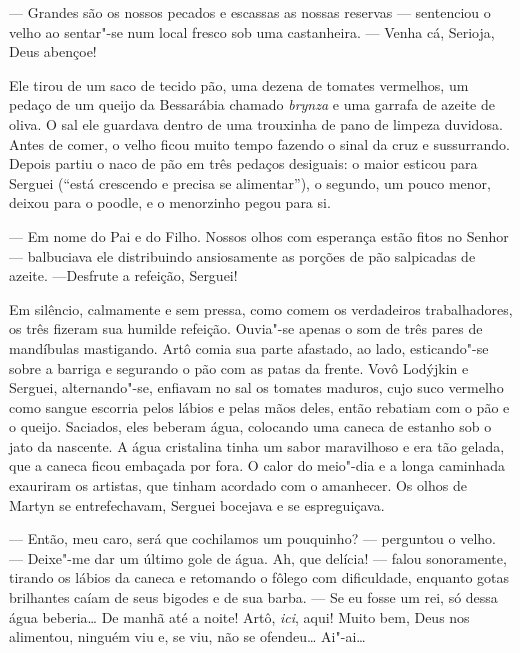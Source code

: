--- Grandes são os nossos pecados e escassas as nossas reservas ---
sentenciou o velho ao sentar"-se num local fresco sob uma castanheira.
--- Venha cá, Serioja, Deus abençoe!

Ele tirou de um saco de tecido pão, uma dezena de tomates vermelhos, um
pedaço de um queijo da Bessarábia chamado \emph{brynza} e uma garrafa de
azeite de oliva. O sal ele guardava dentro de uma trouxinha de pano de
limpeza duvidosa. Antes de comer, o velho ficou muito tempo fazendo o
sinal da cruz e sussurrando. Depois partiu o naco de pão em três pedaços
desiguais: o maior esticou para Serguei (``está crescendo e precisa se
alimentar''), o segundo, um pouco menor, deixou para o poodle, e o
menorzinho pegou para si.

--- Em nome do Pai e do Filho. Nossos olhos com esperança estão fitos no
Senhor --- balbuciava ele distribuindo ansiosamente as porções de pão
salpicadas de azeite. ---Desfrute a refeição, Serguei!

Em silêncio, calmamente e sem pressa, como comem os verdadeiros
trabalhadores, os três fizeram sua humilde refeição. Ouvia"-se apenas o
som de três pares de mandíbulas mastigando. Artô comia sua parte
afastado, ao lado, esticando"-se sobre a barriga e segurando o pão com as
patas da frente. Vovô Lodýjkin e Serguei, alternando"-se, enfiavam no sal
os tomates maduros, cujo suco vermelho como sangue escorria pelos lábios
e pelas mãos deles, então rebatiam com o pão e o queijo. Saciados, eles
beberam água, colocando uma caneca de estanho sob o jato da nascente. A
água cristalina tinha um sabor maravilhoso e era tão gelada, que a
caneca ficou embaçada por fora. O calor do meio"-dia e a longa caminhada
exauriram os artistas, que tinham acordado com o amanhecer. Os olhos de
Martyn se entrefechavam, Serguei bocejava e se espreguiçava.

--- Então, meu caro, será que cochilamos um pouquinho? --- perguntou o
velho. --- Deixe"-me dar um último gole de água. Ah, que delícia! ---
falou sonoramente, tirando os lábios da caneca e retomando o fôlego com
dificuldade, enquanto gotas brilhantes caíam de seus bigodes e de sua
barba. --- Se eu fosse um rei, só dessa água beberia\ldots{} De manhã até a
noite! Artô, \emph{ici}, aqui! Muito bem, Deus nos alimentou, ninguém
viu e, se viu, não se ofendeu\ldots{} Ai"-ai\ldots{}

